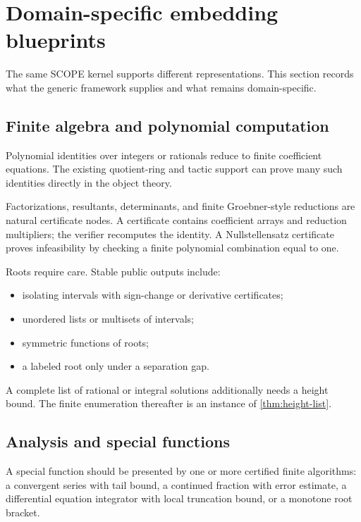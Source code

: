 \section{Domain-specific embedding blueprints}

The same SCOPE kernel supports different representations.  This section records what the generic framework supplies and what remains domain-specific.

\subsection{Finite algebra and polynomial computation}

Polynomial identities over integers or rationals reduce to finite coefficient equations.  The existing quotient-ring and tactic support can prove many such identities directly in the object theory.

Factorizations, resultants, determinants, and finite Groebner-style reductions are natural certificate nodes.  A certificate contains coefficient arrays and reduction multipliers; the verifier recomputes the identity.  A Nullstellensatz certificate proves infeasibility by checking a finite polynomial combination equal to one.

Roots require care.  Stable public outputs include:

\begin{itemize}
\item isolating intervals with sign-change or derivative certificates;
\item unordered lists or multisets of intervals;
\item symmetric functions of roots;
\item a labeled root only under a separation gap.
\end{itemize}

A complete list of rational or integral solutions additionally needs a height bound.  The finite enumeration thereafter is an instance of \cref{thm:height-list}.

\subsection{Analysis and special functions}

A special function should be presented by one or more certified finite algorithms: a convergent series with tail bound, a continued fraction with error estimate, a differential equation integrator with local truncation bound, or a monotone root bracket.

